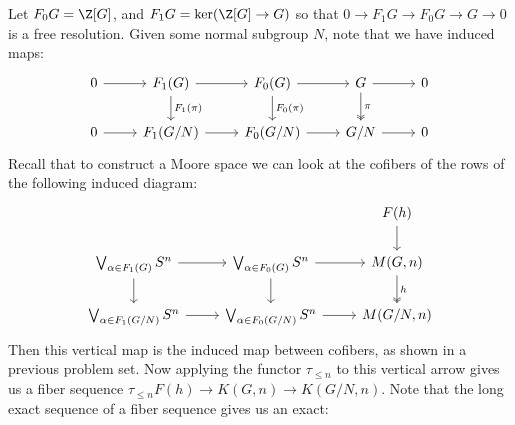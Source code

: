 \documentclass[11pt,letterpaper]{article}
\begin{document}
\begin{solution}
    \quad Let $F_0G = \Z[G]$, and $F_1G = \ker(\Z[G] \to G)$ so that $0\to F_1G \to F_0G \to G \to 0$ is a free resolution. Given some normal subgroup $N$, note that we have induced maps:
    \[\begin{tikzcd}
        0 & {F_1(G)} & {F_0(G)} & G & 0 \\
        0 & {F_1(G/N)} & {F_0(G/N)} & {G/N} & 0
        \arrow["\pi", two heads, from=1-4, to=2-4]
        \arrow[from=1-3, to=1-4]
        \arrow[from=1-2, to=1-3]
        \arrow[from=1-4, to=1-5]
        \arrow[from=2-1, to=2-2]
        \arrow[from=1-1, to=1-2]
        \arrow[from=2-4, to=2-5]
        \arrow[from=2-3, to=2-4]
        \arrow[from=2-2, to=2-3]
        \arrow["{F_0(\pi)}", from=1-3, to=2-3]
        \arrow["{F_1(\pi)}", from=1-2, to=2-2]
    \end{tikzcd}\]
    Recall that to construct a Moore space we can look at the cofibers of the rows of the following induced diagram:
    \[\begin{tikzcd}
        && {F(h)} \\
        {\bigvee_{\alpha\in F_1(G)}S^n} & {\bigvee_{\alpha\in F_0(G)}S^n} & {M(G,n)} \\
        {\bigvee_{\alpha\in F_1(G/N)}S^n} & {\bigvee_{\alpha\in F_0(G/N)}S^n} & {M(G/N,n)}
        \arrow[from=2-1, to=2-2]
        \arrow[from=3-1, to=3-2]
        \arrow[from=2-1, to=3-1]
        \arrow[from=2-2, to=3-2]
        \arrow[from=2-2, to=2-3]
        \arrow[from=3-2, to=3-3]
        \arrow["h", two heads, from=2-3, to=3-3]
        \arrow[from=1-3, to=2-3]
    \end{tikzcd}\]
    Then this vertical map is the induced map between cofibers, as shown in a previous problem set. Now applying the functor $\tau_{\leq n}$ to this vertical arrow gives us a fiber sequence $\tau_{\leq n}F(h) \to K(G,n) \to K(G/N, n)$. Note that the long exact sequence of a fiber sequence gives us an exact:

\end{solution}
\end{document}
